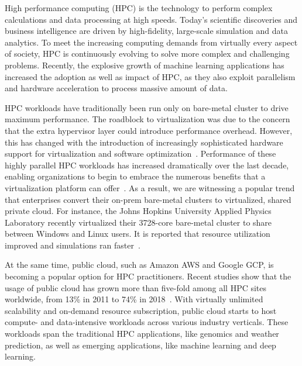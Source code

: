 High performance computing (HPC) is the technology to perform complex calculations and data processing at high speeds. 
Today's scientific discoveries and business intelligence are driven by high-fidelity, 
large-scale simulation and data analytics. To meet the increasing computing demands from 
virtually every aspect of society, HPC is continuously evolving to solve more 
complex and challenging problems. 
Recently, the explosive growth of machine learning applications has increased the adoption as well as 
impact of HPC, as they also exploit parallelism and hardware acceleration to process  
massive amount of data.


HPC workloads have traditionally been run only on bare-metal cluster to drive maximum 
performance. 
The roadblock to virtualization was due to the concern that the extra hypervisor layer could introduce 
performance overhead. 
However, this has changed with the introduction of increasingly sophisticated 
hardware support for virtualization and software optimization~\cite{madukkarumukumana2008resource,bugnion2017hardware}. Performance of 
these highly parallel HPC workloads has increased dramatically over the last decade, 
enabling organizations to begin to embrace the numerous benefits that a virtualization platform can 
offer~\cite{michael2018overcommit}. As a result, we are witnessing a popular trend that enterprises convert 
their on-prem bare-metal clusters to virtualized, shared private cloud. For instance, the Johns Hopkins 
University Applied Physics Laboratory recently virtualized their 3728-core bare-metal cluster 
to share between Windows and Linux users. 
It is reported that resource utilization improved and simulations ran faster~\cite{vmware2017josh}.

At the same time, public cloud, such as Amazon AWS and Google GCP, is becoming a popular option for 
HPC practitioners. Recent studies show that the usage of public cloud has grown more than five-fold among all HPC 
sites worldwide, from 13\% in 2011 to 74\% in 2018~\cite{hyperion2019}.
With virtually unlimited scalability and on-demand resource subscription, public cloud starts to host 
compute- and data-intensive workloads across various industry verticals. These workloads span the traditional HPC 
applications, like genomics and 
weather prediction, as well as emerging applications, like machine learning and deep learning. 

